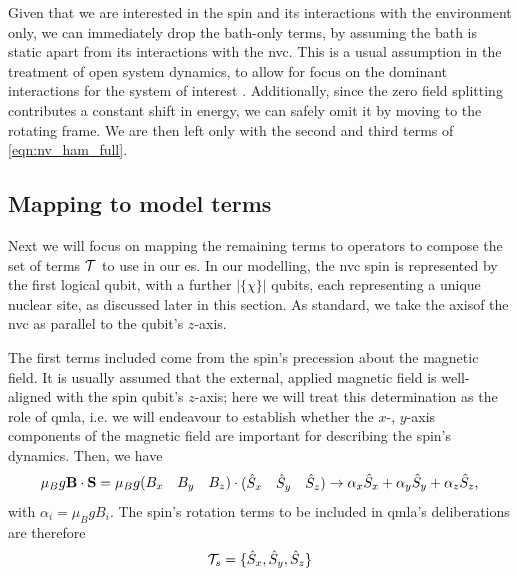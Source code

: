 
Given that we are interested in the spin and its interactions with the environment only, 
    we can immediately drop the bath-only terms, by assuming the bath is static 
    apart from its interactions with the \gls{nvc}. 
This is a usual assumption in the treatment of open system dynamics, 
    to allow for focus on the dominant interactions for the system of interest \cite{breuer2002theory}. 
Additionally, since the zero field splitting contributes a constant shift in energy, 
    we can safely omit it by moving to the rotating frame. 
We are then left only with the second and third terms of \cref{eqn:nv_ham_full}. 

\subsection{Mapping to model terms}
Next we will focus on mapping the remaining terms to operators to compose the set of terms 
    ${ \mathcal{T} }$ to use in our \gls{es}. 
In our modelling, the \gls{nvc} spin is represented by the first logical qubit, 
    with a further $|\{\chi\}|$ qubits, each representing a unique nuclear site, 
    as discussed later in this section. 
As standard, we take the axis\footnotemark of the \gls{nvc} as parallel to the qubit's $z$-axis. 

\par 

The first terms included come from the spin's precession about the magnetic field. 
It is usually assumed that the external, applied magnetic field is well-aligned with the 
    spin qubit's $z$-axis; here we will treat this determination as the role of \gls{qmla}, 
    i.e. we will endeavour to establish whether the $x$-, $y$-axis components of the magnetic field 
    are important for describing the spin's dynamics. 
Then, we have
\begin{equation}
    \mu_B g \mathbf{B} \cdot \mathbf{S} 
    = \mu_B g \begin{matrix}(B_x & B_y & B_z)\end{matrix} \cdot \begin{matrix}(\hat{S}_x & \hat{S}_y & \hat{S}_z)\end{matrix}
    \rightarrow \alpha_x \hat{S}_x + \alpha_y \hat{S}_y + \alpha_z \hat{S}_z,
\end{equation}
with $\alpha_i = \mu_B g B_i$. 
The spin's rotation terms to be included in \gls{qmla}'s deliberations are therefore 
\begin{equation}
    \label{eqn:exp_spin_terms}
    { \mathcal{T} }_{s} = \{ \hat{S}_x, \hat{S}_y, \hat{S}_z\}
\end{equation}
\par 

